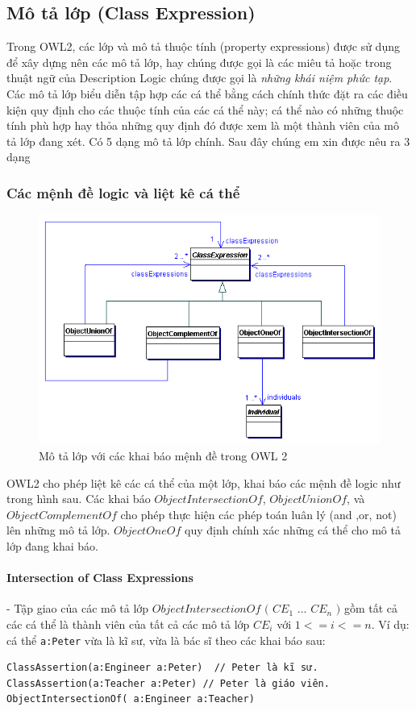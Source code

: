 \subsection{Mô tả lớp (Class Expression)}
Trong OWL2, các lớp và mô tả thuộc tính (property expressions) được sử dụng để xây dựng nên các mô tả lớp, hay chúng được gọi là các miêu tả hoặc trong thuật ngữ của Description Logic chúng được gọi là \textit{những khái niệm phức tạp}. Các mô tả lớp 
biểu diễn tập hợp các cá thể bằng cách chính thức đặt ra các điều kiện quy định cho các thuộc tính của các cá thể này; cá thể nào có những thuộc tính phù hợp hay thỏa những quy định đó được xem là một thành viên của mô tả lớp đang xét. Có 5 dạng mô tả lớp chính. Sau đây chúng em xin được nêu ra 3 dạng 
\subsubsection{Các mệnh đề logic và liệt kê cá thể}
\begin{figure}[h]
	\centering
	\includegraphics[width=120mm]{Figures/ce_0.png}
	\caption{Mô tả lớp với các khai báo mệnh đề trong OWL 2\label{overflow}}
\end{figure}
OWL2 cho phép liệt kê các cá thể của một lớp, khai báo các mệnh đề logic như trong hình sau. Các khai báo $ObjectIntersectionOf$, $ObjectUnionOf$, và $ObjectComplementOf$ cho phép thực hiện các phép toán luân lý (and ,or, not) lên những mô tả lớp. $ObjectOneOf$ quy định chính xác những cá thể cho mô tả lớp đang khai báo.
\paragraph{Intersection of Class Expressions} - Tập giao của các mô tả lớp $ObjectIntersectionOf$ $($ $CE_{1}$ ... $CE_{n}$ $)$ gồm tất cả các cá thể là thành viên của tất cả các mô tả lớp $CE_{i}$ với $1<=i<=n$. Ví dụ: cá thể \verb|a:Peter| vừa là kĩ sư, vừa là bác sĩ theo các khai báo sau:
\begin{verbatim}
ClassAssertion(a:Engineer a:Peter)  // Peter là kĩ sư.
ClassAssertion(a:Teacher a:Peter) // Peter là giáo viên.
ObjectIntersectionOf( a:Engineer a:Teacher)
\end{verbatim}

